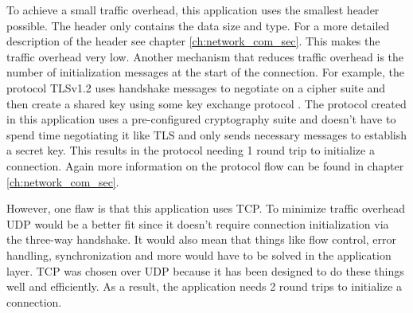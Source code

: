 To achieve a small traffic overhead, this application uses the smallest header possible. The header only contains the data size and type. For a more detailed description of the header see chapter \ref{ch:network_com_sec}. This makes the traffic overhead very low. Another mechanism that reduces traffic overhead is the number of initialization messages at the start of the connection. For example, the protocol TLSv1.2 uses handshake messages to negotiate on a cipher suite and then create a shared key using some key exchange protocol \cite{Ristic2014}. The protocol created in this application uses a pre-configured cryptography suite and doesn't have to spend time negotiating it like TLS and only sends necessary messages to establish a secret key. This results in the protocol needing 1 round trip to initialize a connection. Again more information on the protocol flow can be found in chapter \ref{ch:network_com_sec}.

However, one flaw is that this application uses TCP. To minimize traffic overhead UDP would be a better fit since it doesn't require connection initialization via the three-way handshake. It would also mean that things like flow control, error handling, synchronization and more would have to be solved in the application layer. TCP was chosen over UDP because it has been designed to do these things well and efficiently. As a result, the application needs 2 round trips to initialize a connection.
